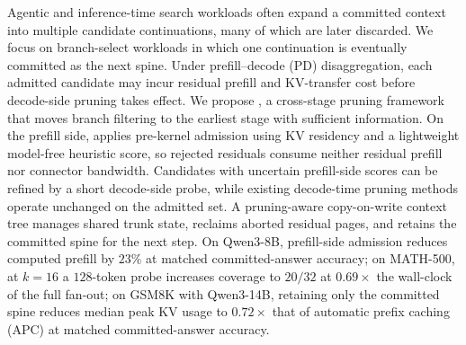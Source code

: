 Agentic and inference-time search workloads often expand a committed context into multiple candidate continuations, many of which are later discarded.
We focus on branch-select workloads in which one continuation is eventually committed as the next spine.
Under prefill--decode (PD) disaggregation, each admitted candidate may incur residual prefill and KV-transfer cost before decode-side pruning takes effect.
We propose \sys, a cross-stage pruning framework that moves branch filtering to the earliest stage with sufficient information.
On the prefill side, \sys applies pre-kernel admission using KV residency and a lightweight model-free heuristic score, so rejected residuals consume neither residual prefill nor connector bandwidth.
Candidates with uncertain prefill-side scores can be refined by a short decode-side probe, while existing decode-time pruning methods operate unchanged on the admitted set.
A pruning-aware copy-on-write context tree manages shared trunk state, reclaims aborted residual pages, and retains the committed spine for the next step.
On Qwen3-8B, prefill-side admission reduces computed prefill by $23\%$ at matched committed-answer accuracy; on MATH-500, at $k{=}16$ a $128$-token probe increases coverage to $20/32$ at $0.69\times$ the wall-clock of the full fan-out; on GSM8K with Qwen3-14B, retaining only the committed spine reduces median peak KV usage to $0.72\times$ that of automatic prefix caching (APC) at matched committed-answer accuracy.
